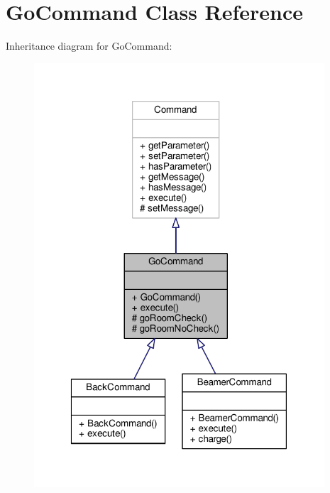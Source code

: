 \hypertarget{classGoCommand}{\section{Go\-Command Class Reference}
\label{classGoCommand}
}


Inheritance diagram for Go\-Command\-:
\nopagebreak
\begin{figure}[H]
\begin{center}
\leavevmode
\includegraphics[width=307pt]{classGoCommand__inherit__graph}
\end{center}
\end{figure}


